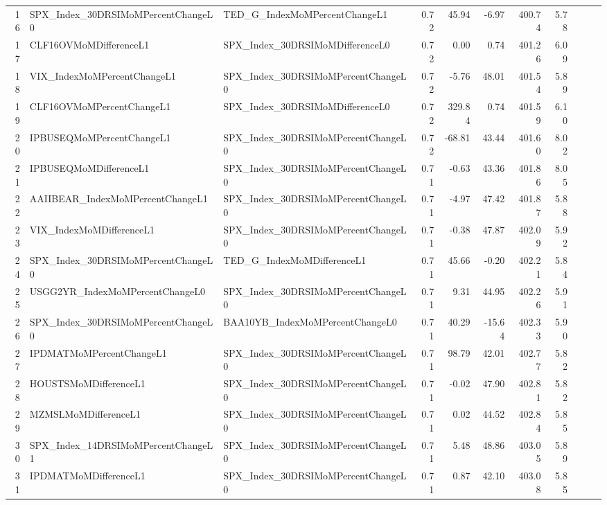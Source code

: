 \begin{longtable}{rllrrrrrlll}
  16 & SPX\_Index\_30DRSIMoMPercentChangeL0 & TED\_G\_IndexMoMPercentChangeL1 & 0.72 & 45.94 & -6.97 & 400.74 & 5.78 &  &  &  \\ 
  17 & CLF16OVMoMDifferenceL1 & SPX\_Index\_30DRSIMoMDifferenceL0 & 0.72 & 0.00 & 0.74 & 401.26 & 6.09 &  &  &  \\ 
  18 & VIX\_IndexMoMPercentChangeL1 & SPX\_Index\_30DRSIMoMPercentChangeL0 & 0.72 & -5.76 & 48.01 & 401.54 & 5.89 &  &  &  \\ 
  19 & CLF16OVMoMPercentChangeL1 & SPX\_Index\_30DRSIMoMDifferenceL0 & 0.72 & 329.84 & 0.74 & 401.59 & 6.10 &  &  &  \\ 
  20 & IPBUSEQMoMPercentChangeL1 & SPX\_Index\_30DRSIMoMPercentChangeL0 & 0.72 & -68.81 & 43.44 & 401.60 & 8.02 &  &  &  \\ 
  21 & IPBUSEQMoMDifferenceL1 & SPX\_Index\_30DRSIMoMPercentChangeL0 & 0.71 & -0.63 & 43.36 & 401.86 & 8.05 &  &  &  \\ 
  22 & AAIIBEAR\_IndexMoMPercentChangeL1 & SPX\_Index\_30DRSIMoMPercentChangeL0 & 0.71 & -4.97 & 47.42 & 401.87 & 5.88 &  &  &  \\ 
  23 & VIX\_IndexMoMDifferenceL1 & SPX\_Index\_30DRSIMoMPercentChangeL0 & 0.71 & -0.38 & 47.87 & 402.09 & 5.92 &  &  &  \\ 
  24 & SPX\_Index\_30DRSIMoMPercentChangeL0 & TED\_G\_IndexMoMDifferenceL1 & 0.71 & 45.66 & -0.20 & 402.21 & 5.84 &  &  &  \\ 
  25 & USGG2YR\_IndexMoMPercentChangeL0 & SPX\_Index\_30DRSIMoMPercentChangeL0 & 0.71 & 9.31 & 44.95 & 402.26 & 5.91 &  &  &  \\ 
  26 & SPX\_Index\_30DRSIMoMPercentChangeL0 & BAA10YB\_IndexMoMPercentChangeL0 & 0.71 & 40.29 & -15.64 & 402.33 & 5.90 &  &  &  \\ 
  27 & IPDMATMoMPercentChangeL1 & SPX\_Index\_30DRSIMoMPercentChangeL0 & 0.71 & 98.79 & 42.01 & 402.77 & 5.82 &  &  &  \\ 
  28 & HOUSTSMoMDifferenceL1 & SPX\_Index\_30DRSIMoMPercentChangeL0 & 0.71 & -0.02 & 47.90 & 402.81 & 5.82 &  &  &  \\ 
  29 & MZMSLMoMDifferenceL1 & SPX\_Index\_30DRSIMoMPercentChangeL0 & 0.71 & 0.02 & 44.52 & 402.84 & 5.85 &  &  &  \\ 
  30 & SPX\_Index\_14DRSIMoMPercentChangeL1 & SPX\_Index\_30DRSIMoMPercentChangeL0 & 0.71 & 5.48 & 48.86 & 403.05 & 5.89 &  &  &  \\ 
  31 & IPDMATMoMDifferenceL1 & SPX\_Index\_30DRSIMoMPercentChangeL0 & 0.71 & 0.87 & 42.10 & 403.08 & 5.85 &  &  &  \\ 

\end{longtable}
